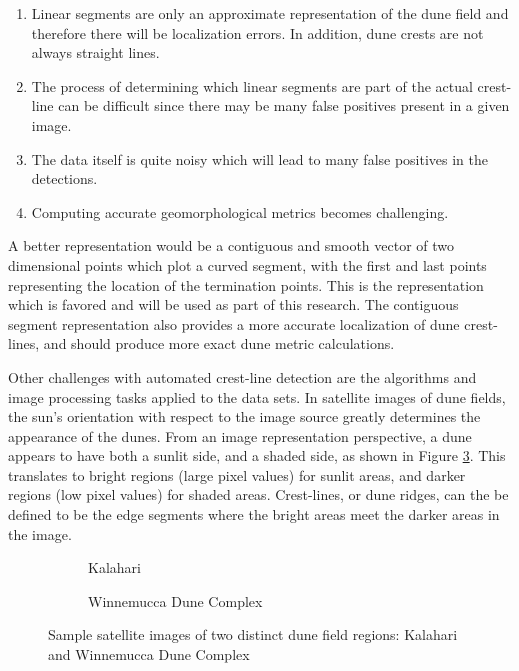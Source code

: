 \begin{enumerate}
	\item Linear segments are only an approximate representation of the dune field and therefore there will be localization errors. In addition, dune crests are not always straight lines.
	\item The process of determining which linear segments are part of the actual crest-line can be difficult since there may be many false positives present in a given image.
	\item The data itself is quite noisy which will lead to many false positives in the detections.
	\item Computing accurate geomorphological metrics becomes challenging.
\end{enumerate}

A better representation would be a contiguous and smooth vector of two dimensional points which plot a curved segment, with the first and last points representing the location of the termination points. This is the representation which is favored and will be used as part of this research. The contiguous segment representation also provides a more accurate localization of dune crest-lines, and should produce more exact dune metric calculations.

Other challenges with automated crest-line detection are the algorithms and image processing tasks applied to the data sets. In satellite images of dune fields, the sun's orientation with respect to the image source greatly determines the appearance of the dunes. From an image representation perspective, a dune appears to have both a sunlit side, and a shaded side, as shown in Figure \ref{fig:intro_sample_images}. This translates to bright regions (large pixel values) for sunlit areas, and darker regions (low pixel values) for shaded areas. Crest-lines, or dune ridges, can the be defined to be the edge segments where the bright areas meet the darker areas in the image.

\begin{figure}
	\centering
	\begin{subfigure}{0.45\textwidth}
		\centering
		\caption{ Kalahari }
		\label{fig:intro_kalahari_image}
	\end{subfigure}
	\begin{subfigure}{0.45\textwidth}
		\centering
		\caption{ Winnemucca Dune Complex }
		\label{fig:intro_wdc_image}
	\end{subfigure}
	\caption{Sample satellite images of two distinct dune field regions: Kalahari and  Winnemucca Dune Complex }
	\label{fig:intro_sample_images}
\end{figure}

